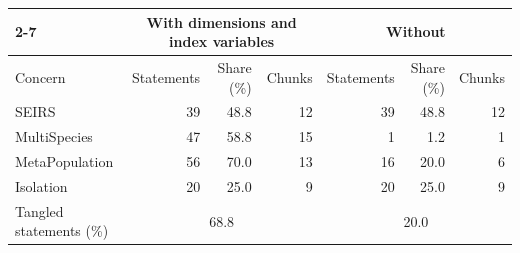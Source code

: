 \setlength{\tabcolsep}{3pt}
\begin{tabular}{|l|r|r|r|r|r|r|}
\cmidrule{2-7}
\multicolumn{1}{c|}{} & \multicolumn{3}{c|}{With dimensions and index variables} & \multicolumn{3}{c|}{Without} \\
\hline
Concern & Statements & Share (\%) & Chunks & Statements & Share (\%) & Chunks \\
\hline
SEIRS & 39 & 48.8 & 12 & 39 & 48.8 & 12 \\
MultiSpecies & 47 & 58.8 & 15 & 1 & 1.2 & 1 \\
MetaPopulation & 56 & 70.0 & 13 & 16 & 20.0 & 6 \\
Isolation & 20 & 25.0 & 9 & 20 & 25.0 & 9 \\
\hline
Tangled statements (\%) & \multicolumn{3}{c|}{68.8} & \multicolumn{3}{c|}{20.0} \\
\hline
\end{tabular}
